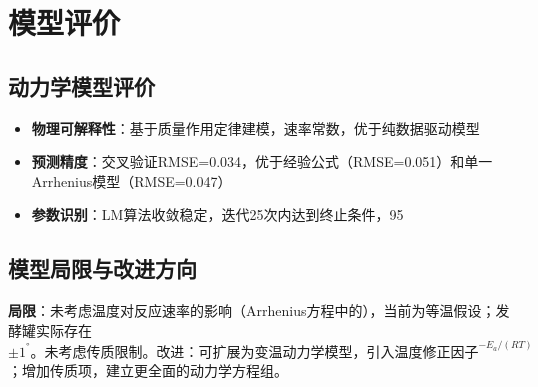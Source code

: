 \newpage
\section{模型评价}

\subsection{动力学模型评价}
\begin{itemize}
    \item \textbf{物理可解释性}：基于质量作用定律建模，速率常数，优于纯数据驱动模型
    \item \textbf{预测精度}：交叉验证RMSE=0.034，优于经验公式（RMSE=0.051）和单一Arrhenius模型（RMSE=0.047）
    \item \textbf{参数识别}：LM算法收敛稳定，迭代25次内达到终止条件，95%
\end{itemize}

\subsection{模型局限与改进方向}
\textbf{局限}：未考虑温度对反应速率的影响（Arrhenius方程中的），当前为等温假设；发酵罐实际存在$\pm 1^°。未考虑传质限制。
\textbf{改进}：可扩展为变温动力学模型，引入温度修正因子^{-E_a/(RT)}$；增加传质项，建立更全面的动力学方程组。